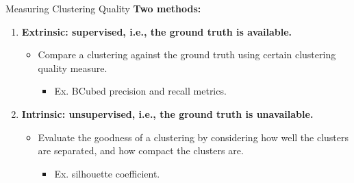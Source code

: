 \begin{frame}{Measuring Clustering Quality}
  \textbf{Two methods:}
  \begin{enumerate}
  \item \textbf{{\color{airforceblue}Extrinsic}: supervised, i.e.,
      the ground truth is available.}
    \begin{itemize}
    \item Compare a clustering against the ground truth using
      certain clustering quality measure.
      \begin{itemize}
      \item Ex. BCubed precision and recall metrics.
      \end{itemize}
    \end{itemize}
  \item \textbf{{\color{airforceblue}Intrinsic}: unsupervised, i.e.,
      the ground truth is unavailable.}
    \begin{itemize}
    \item Evaluate the goodness of a clustering by considering how
      well the clusters are separated, and how compact the clusters
      are.
      \begin{itemize}
      \item Ex. silhouette coefficient.
      \end{itemize}
    \end{itemize}
  \end{enumerate}
\end{frame}

